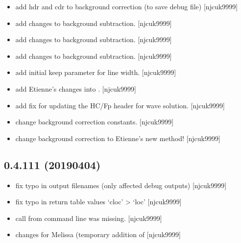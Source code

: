 \documentclass[a4paper,10pt,english]{report}
\begin{document}
\begin{itemize}
\item {} 
 \sphinxhyphen{} add hdr and cdr to background correction (to
save debug file) {[}njcuk9999{]}

\item {} 
 \sphinxhyphen{} add changes to background subtraction.
{[}njcuk9999{]}

\item {} 
 \sphinxhyphen{} add changes to background subtraction.
{[}njcuk9999{]}

\item {} 
 \sphinxhyphen{} add changes to background subtraction.
{[}njcuk9999{]}

\item {} 
 \sphinxhyphen{} add initial keep parameter for line width. {[}njcuk9999{]}

\item {} 
 \sphinxhyphen{} add Etienne’s changes into
. {[}njcuk9999{]}

\item {} 
 \sphinxhyphen{} add fix for updating the HC/Fp header
for wave solution. {[}njcuk9999{]}

\item {} 
 \sphinxhyphen{} change background correction constants.
{[}njcuk9999{]}

\item {} 
 \sphinxhyphen{} change background correction to Etienne’s
new method! {[}njcuk9999{]}

\end{itemize}


\subsection{0.4.111 (2019\sphinxhyphen{}04\sphinxhyphen{}04)}
\label{\detokenize{misc/changelog:id168}}\begin{itemize}
\item {} 
 \sphinxhyphen{} fix typo in output filenames (only affected
debug outputs) {[}njcuk9999{]}

\item {} 
 \sphinxhyphen{} fix typo in return table values ‘cloc’ \textendash{}\textgreater{} ‘loc’
{[}njcuk9999{]}

\item {} 
 \sphinxhyphen{} call from command line was missing. {[}njcuk9999{]}

\item {} 
 changes for Melissa (temporary addition of
 {[}njcuk9999{]}

\end{itemize}
\end{document}
